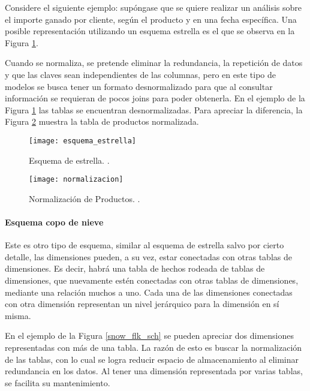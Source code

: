 \documentclass[a4paper,11pt]{article}
\begin{document}
    Considere el siguiente ejemplo: supóngase que se quiere realizar un análisis sobre el importe ganado por cliente, según el producto y en una fecha
    específica. Una posible representación utilizando un esquema estrella es el que se observa en la Figura \ref{star_sch}.
    
    Cuando se normaliza, se pretende eliminar la redundancia, la repetición de datos y que las claves sean independientes de
    las columnas, pero en este tipo de modelos se busca tener un formato desnormalizado para que al consultar información se requieran de pocos joins para
    poder obtenerla. En el ejemplo de la Figura \ref{star_sch} las tablas se encuentran desnormalizadas. Para apreciar la
    diferencia, la Figura \ref{normalizado} muestra la tabla de productos normalizada.
    
    \begin{figure}
      \begin{center}
        \texttt{[image: esquema\_estrella]}
        \caption{Esquema de estrella. \cite[p.~38]{hefestov2}.}
        \label{star_sch}
      \end{center}
    \end{figure}
    
    \begin{figure}
      \begin{center}
        \texttt{[image: normalizacion]}
        \caption{Normalización de Productos. \cite[p.~38]{hefestov2}.}
        \label{normalizado}
      \end{center}
    \end{figure}
    
    
    \paragraph{Esquema copo de nieve}
    
    Este es otro tipo de esquema, similar al esquema de estrella salvo por cierto detalle, las dimensiones pueden, a su vez, estar conectadas con otras 
    tablas de dimensiones. Es decir, habrá una tabla de hechos rodeada de tablas de dimensiones, que nuevamente estén conectadas con otras tablas de 
    dimensiones, mediante una relación muchos a uno. Cada una de las dimensiones conectadas con otra dimensión representan un nivel jerárquico para la dimensión en 
    sí misma.
    
    En el ejemplo de la Figura \ref{snow_flk_sch} se pueden apreciar dos dimensiones representadas con más de una tabla.
    La razón de esto es buscar la normalización de las tablas, con  lo cual se logra reducir espacio de almacenamiento al eliminar redundancia en los datos.
    Al tener una dimensión representada por varias tablas, se facilita su mantenimiento. %
    
\end{document}
